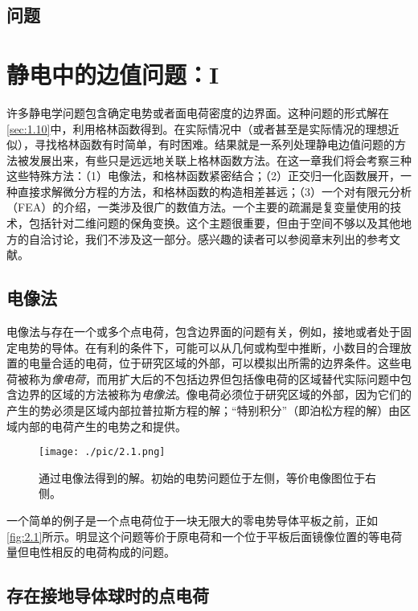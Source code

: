 \documentclass[12pt]{book}
\numberwithin{equation}{chapter}
\numberwithin{figure}{chapter}
\numberwithin{footnote}{page}
\begin{document}
\section*{问题}

\chapter{静电中的边值问题：I}\label{cha:2}

许多静电学问题包含确定电势或者面电荷密度的边界面。这种问题的形式解在\autoref{sec:1.10}中，利用格林函数得到。在实际情况中（或者甚至是实际情况的理想近似），寻找格林函数有时简单，有时困难。结果就是一系列处理静电边值问题的方法被发展出来，有些只是远远地关联上格林函数方法。在这一章我们将会考察三种这些特殊方法：（1）电像法，和格林函数紧密结合；（2）正交归一化函数展开，一种直接求解微分方程的方法，和格林函数的构造相差甚远；（3）一个对有限元分析（FEA）的介绍，一类涉及很广的数值方法。一个主要的疏漏是复变量使用的技术，包括针对二维问题的保角变换。这个主题很重要，但由于空间不够以及其他地方的自洽讨论，我们不涉及这一部分。感兴趣的读者可以参阅章末列出的参考文献。

\section{电像法}\label{sec:2.1}

电像法与存在一个或多个点电荷，包含边界面的问题有关，例如，接地或者处于固定电势的导体。在有利的条件下，可能可以从几何或构型中推断，小数目的合理放置的电量合适的电荷，位于研究区域的外部，可以模拟出所需的边界条件。这些电荷被称为\textit{像电荷}，而用扩大后的不包括边界但包括像电荷的区域替代实际问题中包含边界的区域的方法被称为\textit{电像法}。像电荷必须位于研究区域的外部，因为它们的产生的势必须是区域内部拉普拉斯方程的解；“特别积分”（即泊松方程的解）由区域内部的电荷产生的电势之和提供。

\begin{figure}[!ht]
    \centering
    \texttt{[image: ./pic/2.1.png]}
    \captionsetup{justification=raggedright, singlelinecheck=false}
    \caption{通过电像法得到的解。初始的电势问题位于左侧，等价电像图位于右侧。}
    \label{fig:2.1}
\end{figure}

一个简单的例子是一个点电荷位于一块无限大的零电势导体平板之前，正如\autoref{fig:2.1}所示。明显这个问题等价于原电荷和一个位于平板后面镜像位置的等电荷量但电性相反的电荷构成的问题。

\section{存在接地导体球时的点电荷}\label{sec:2.2}
\end{document}

